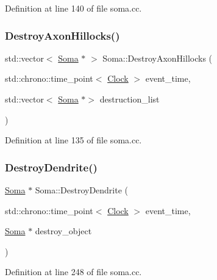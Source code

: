 Definition at line 140 of file soma.\+cc.

\mbox{\label{class_soma_a5220929442601962af1a1fad66a8c919}} 
\subsubsection{\texorpdfstring{Destroy\+Axon\+Hillocks()}{DestroyAxonHillocks()}}
{\footnotesize\ttfamily std\+::vector$<$ \mbox{\hyperlink{class_soma}{Soma}} $\ast$ $>$ Soma\+::\+Destroy\+Axon\+Hillocks (\begin{DoxyParamCaption}\item[{std\+::chrono\+::time\+\_\+point$<$ \mbox{\hyperlink{universe_8h_a0ef8d951d1ca5ab3cfaf7ab4c7a6fd80}{Clock}} $>$}]{event\+\_\+time,  }\item[{std\+::vector$<$ \mbox{\hyperlink{class_soma}{Soma}} $\ast$$>$}]{destruction\+\_\+list }\end{DoxyParamCaption})}



Definition at line 135 of file soma.\+cc.

\mbox{\label{class_soma_a086cb5a05e82f6f58ac0bd8403e25e07}} 
\subsubsection{\texorpdfstring{Destroy\+Dendrite()}{DestroyDendrite()}}
{\footnotesize\ttfamily \mbox{\hyperlink{class_soma}{Soma}} $\ast$ Soma\+::\+Destroy\+Dendrite (\begin{DoxyParamCaption}\item[{std\+::chrono\+::time\+\_\+point$<$ \mbox{\hyperlink{universe_8h_a0ef8d951d1ca5ab3cfaf7ab4c7a6fd80}{Clock}} $>$}]{event\+\_\+time,  }\item[{\mbox{\hyperlink{class_soma}{Soma}} $\ast$}]{destroy\+\_\+object }\end{DoxyParamCaption})}



Definition at line 248 of file soma.\+cc.

\mbox{\label{class_soma_ac549a7caf885fdc0ac3a6adf393430af}} 
